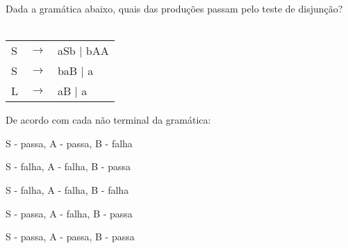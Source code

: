 \question[10]
Dada a gramática abaixo, quais das produções passam pelo teste de disjunção?\\
\\
\begin{tabular}{|l c l}
	S & $\rightarrow$ & aSb | bAA \\
    S & $\rightarrow$ & b{aB} | a \\
	L & $\rightarrow$ & aB | a \\
\end{tabular}

De acordo com cada não terminal da gramática:
\begin{choices}
\item S - passa, A - passa, B - falha %
\item S - falha, A - falha, B - passa
\item S - falha, A - falha, B - falha
\item S - passa, A - falha, B - passa
\item S - passa, A - passa, B - passa
\end{choices}
\answerline

